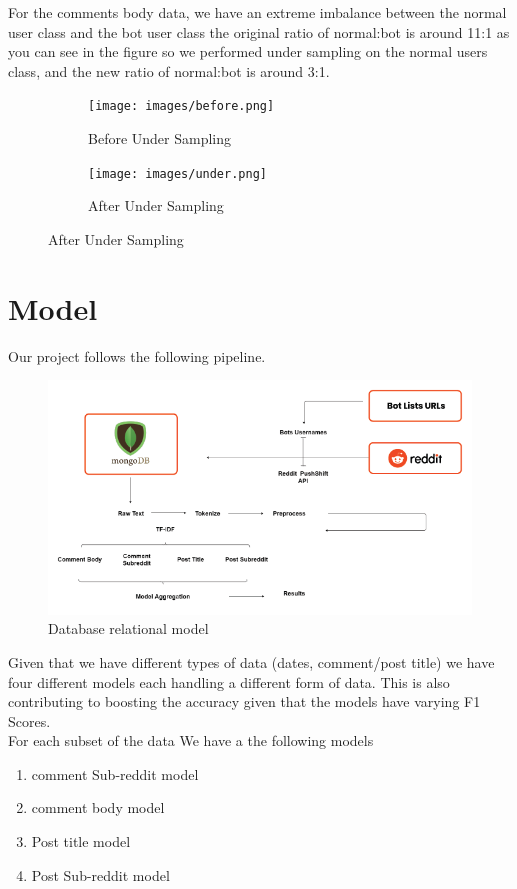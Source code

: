 \documentclass{article}
\begin{document}
For the comments body data, we have an extreme imbalance between the normal user class and the bot user class the original ratio of normal:bot is around 11:1  as you can see in the figure so we performed under sampling on the normal users class, and the new ratio of normal:bot is around 3:1.

    \begin{figure}[H]

        \begin{subfigure}[t]{.5\textwidth}
            \centering
            \texttt{[image: images/before.png]}
                \caption{Before Under Sampling}
            \end{subfigure}
        \hfill
        \begin{subfigure}[t]{.5\textwidth}
            \centering
            \texttt{[image: images/under.png]}
                            \caption{After Under Sampling}
        \end{subfigure}
    \end{figure}
\newpage
\section{Model}
Our project follows the following pipeline. \par
\begin{figure}[H]
    \centering
    \includegraphics[width=15cm ,keepaspectratio]{pipeline}
    \caption{Database relational model}
\end{figure} 
Given that we have different types of data (dates, comment/post title) we have four different models each handling a different form of data. This is also contributing to boosting the accuracy given that the models have varying F1 Scores.\\
For each subset of the data We have a the following models
\begin{enumerate}
    \item comment Sub-reddit model
    \item comment body model
    \item Post title model
    \item Post Sub-reddit model
\end{enumerate}
    
\end{document}
